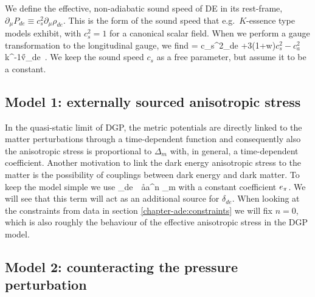 We define the effective, non-adiabatic sound speed of DE in its rest-frame, 
$\partial_\mu P_{de}\equiv c_s^2 \partial_\mu \rho_{de}$. This is the form of 
the sound speed that e.g.\ $K$-essence type models exhibit, with $c_s^2=1$ for a 
canonical scalar field. When we perform a gauge transformation to the 
longitudinal gauge, we find
\be
{} = c_s^2\delta_{de} +3(1+w)\(c_s^2 - c_a^2\) 
    k^{-1}\H v_{de} \,. \label{eq:dp}
\ee
We keep the sound speed $c_s$ as a free parameter, but assume it to be a 
constant.




\subsection{Model 1: externally sourced anisotropic stress}

In the quasi-static limit of DGP, the metric potentials are directly linked to 
the matter  perturbations through a time-dependent function \cite{Koyama:2005kd} 
and consequently also the anisotropic stress is proportional to $\Delta_m$ 
\cite{Kunz:2006ca} with, in general, a time-dependent coefficient. Another 
motivation to link the dark energy anisotropic stress to the matter is the 
possibility of couplings between dark energy and dark matter. To keep the model 
simple we use
\be
  \pi_{de}\ \equiv\  \aa a^n \Delta_m
\label{eq:model:1}
\ee
with a constant coefficient $\aa$. We will see that this term will act as an 
additional source for $\delta_{de}$. When looking at the constraints from 
data in section \ref{chapter-ade:constraints} we will fix $n=0$, which is also roughly the behaviour of the effective
anisotropic stress in the DGP model.



\subsection{Model 2: counteracting the pressure perturbation}


